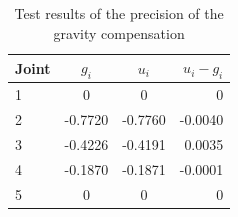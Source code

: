 \begin{table}[htbp]
\centering
\caption{Test results of the precision of the gravity compensation}
\label{table:gravity}
    \begin{tabular}{l c c r}
        \toprule
        Joint  &  $g_i$ & $u_i$ & $u_i-g_i$\\
        \midrule
        1 & 0 & 0 & 0\\
        2 & -0.7720  & -0.7760  & -0.0040 \\
        3 &-0.4226 & -0.4191 & 0.0035 \\
        4 & -0.1870 &-0.1871 & -0.0001\\
        5 & 0 & 0 & 0\\
        \bottomrule
    \end{tabular}
\end{table}

